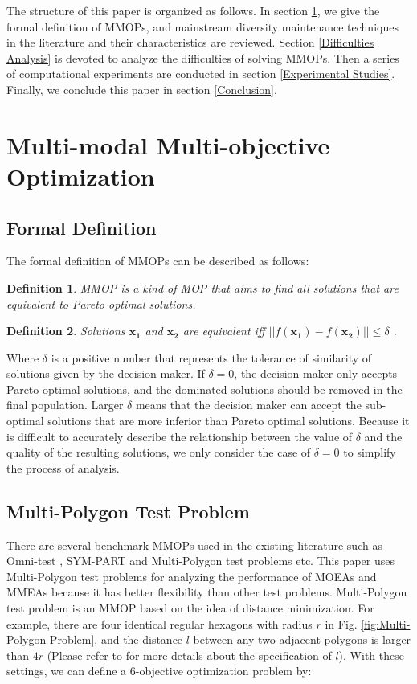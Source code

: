 \documentclass[conference]{IEEEtran}
\newtheorem{definition}{Definition}
\begin{document}
The structure of this paper is organized as follows. In section \ref{Multi-modal Multi-objective Optimization}, we give the formal definition of MMOPs, and mainstream diversity maintenance techniques in the literature and their characteristics are reviewed. Section \ref{Difficulties Analysis} is devoted to analyze the difficulties of solving MMOPs. Then a series of computational experiments are conducted in section \ref{Experimental Studies}. Finally, we conclude this paper in section \ref{Conclusion}.
\section{Multi-modal Multi-objective Optimization}
\label{Multi-modal Multi-objective Optimization}
\subsection{Formal Definition}
The formal definition of MMOPs can be described as follows\cite{tanabe2019review}:
\begin{definition}
MMOP is a kind of MOP that aims to find all solutions that are equivalent to Pareto optimal solutions. 
\end{definition}
\begin{definition}
Solutions $\boldsymbol{x_1}$ and  $\boldsymbol{x_2}$ are equivalent  iff $||f(\boldsymbol{x_1}) - f(\boldsymbol{x_2})|| \leq \delta$ .
\end{definition}
Where $\delta$ is a positive number that represents the tolerance of similarity of solutions given by the decision maker. If $\delta = 0$, the decision maker only accepts Pareto optimal solutions, and the dominated solutions should be removed in the final population.  Larger $\delta$ means that the decision maker can accept the sub-optimal solutions that are more inferior than Pareto optimal solutions. Because it is difficult to accurately describe the relationship between the value of $\delta$ and the quality of the resulting solutions, we only consider the case of $\delta =0$ to simplify the process of analysis. 

\subsection{Multi-Polygon Test Problem}
There are several benchmark MMOPs used in the existing literature such as Omni-test \cite{deb2005omni} , SYM-PART \cite{rudolph2007capabilities} and Multi-Polygon\cite{ishibuchi2019salable} test problems etc. This paper uses Multi-Polygon test problems for analyzing the performance of MOEAs and MMEAs because it has better flexibility than other test problems. Multi-Polygon test problem is an MMOP based on the idea of distance minimization. For example, there are four identical regular hexagons with radius $r$ in Fig. \ref{fig:Multi-Polygon Problem}, and the distance $l$ between any two adjacent polygons is larger than $4r$ (Please refer to \cite{ishibuchi2019salable} for more details about the specification of $l$). With these settings, we can define a 6-objective optimization problem by:
\end{document}
